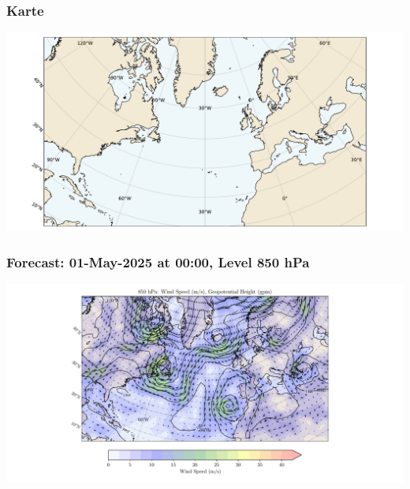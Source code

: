 

\begin{frame}
	\frametitle{Karte}
	\includegraphics[width=\textwidth]{../images/weather/map.pdf}
\end{frame}

\begin{frame}
	\frametitle{Forecast: 01-May-2025 at 00:00, Level 850 hPa}
	\includegraphics[width=\textwidth]{../images/weather/data_2025_5_1_00:00_850.pdf}
\end{frame}



